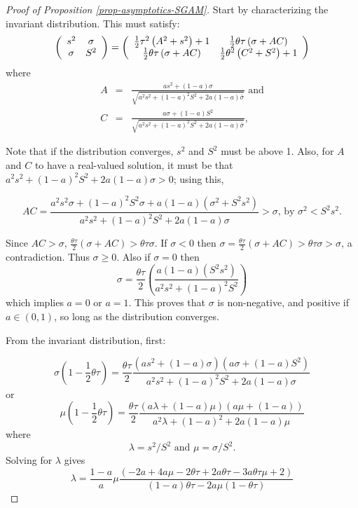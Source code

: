\documentclass[
  12pt,
]{article}
\theoremstyle{definition}
\theoremstyle{definition}
\theoremstyle{definition}
\theoremstyle{definition}
\theoremstyle{remark}
\begin{document}
\begin{proof}[Proof of Proposition \ref{prop-asymptotics-SGAM}]
Start by characterizing the invariant distribution. This must satisfy:%
\[
\left( 
\begin{array}{cc}
s^{2} & \sigma \\ 
\sigma & S^{2}%
\end{array}%
\right) =\left( 
\begin{array}{cc}
\frac{1}{2}\tau ^{2}\left( A^{2}+s^{2}\right) +1 & \frac{1}{2}%
\theta \tau \left( \sigma+AC\right)  \\ 
\frac{1}{2}\theta \tau \left( \sigma+AC\right)  & \frac{1}{%
2}\theta ^{2}\left( C^{2}+S^{2}\right) +1%
\end{array}%
\right) \allowbreak 
\]%
where%
\begin{eqnarray*}
A &=&\frac{as^{2}+\left( 1-a\right) \sigma}{\sqrt{a^{2}%
s^{2}+\left( 1-a\right) ^{2}S^{2}+2a\left( 1-a\right) \bar{\sigma%
}}}\textrm{ \ and} \\
C &=&\frac{a\sigma+\left( 1-a\right) S^{2}}{\sqrt{a^{2}%
s^{2}+\left( 1-a\right) ^{2}S^{2}+2a\left( 1-a\right) \bar{\sigma%
}}},
\end{eqnarray*}%

Note that if the distribution converges, $s^{2}$ and $S^{2}$
must be above 1. Also, for $A$ and $C$ to have a real-valued
solution, it must be that $a^{2}s^{2}+(1-a)^{2}S^{2}+2a(1-a)\sigma>0$;
using this,

\[
AC=\frac{a^{2}s^{2}\sigma+(1-a)^{2}S^{2}\sigma+a(1-a)(\sigma^{2}+S^{2}s^{2})}{a^{2}s^{2}+(1-a)^{2}S^{2}+2a(1-a)\sigma}>\sigma\textrm{, by }\sigma^{2}<S^{2}s^{2}.
\]

Since $AC>\sigma$, $\frac{\theta\tau}{2}(\sigma+AC)>\theta\tau\sigma$.
If $\sigma<0$ then $\sigma=\frac{\theta\tau}{2}(\sigma+AC)>\theta\tau\sigma>\sigma$,
a contradiction. Thus $\sigma\ge0$. Also if $\sigma=0$
then 
\[
\sigma=\frac{\theta\tau}{2}\left(\frac{a(1-a)(S^{2}s^{2})}{a^{2}s^{2}+(1-a)^{2}S^{2}}\right)
\]
which implies $a=0$ or $a=1$. This proves that $\sigma$ is
non-negative, and positive if $a\in(0,1)$, so long as the distribution
converges.

From the invariant distribution, first:

\[
\sigma\left(1-\frac{1}{2}\theta\tau\right)=\frac{\theta\tau}{2}\frac{\left(as^{2}+\left(1-a\right)\sigma\right)\left(a\sigma+\left(1-a\right)S^{2}\right)}{a^{2}s^{2}+\left(1-a\right)^{2}S^{2}+2a\left(1-a\right)\sigma}
\]
or
\[
\mu\left(1-\frac{1}{2}\theta\tau\right)=\frac{\theta\tau}{2}\frac{\left(a\lambda+\left(1-a\right)\mu\right)\left(a\mu+\left(1-a\right)\right)}{a^{2}\lambda+\left(1-a\right)^{2}+2a\left(1-a\right)\mu}
\]
where
\[
\lambda=s^{2}/S^{2}\text{ and }\mu=\sigma/S^{2}.
\]
Solving for $\lambda$ gives
\begin{equation}
\lambda=\frac{1-a}{a}\mu\frac{\left(-2a+4a\mu-2\theta\tau+2a\theta\tau-3a\theta\tau\mu+2\right)\allowbreak}{\left(1-a\right)\theta\tau-2a\mu\left(1-\theta\tau\right)}\label{L}
\end{equation}


\end{proof}
\end{document}
